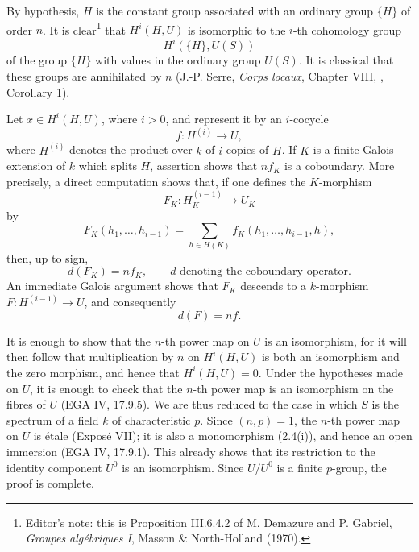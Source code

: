 By hypothesis, \(H\) is the constant group associated with an
ordinary group \(\{H\}\) of order \(n\).  It is
clear\footnote{Editor's note: this is Proposition III.6.4.2 of
M. Demazure and P. Gabriel, \emph{Groupes algébriques I},
Masson \& North-Holland (1970).} that \(H^i(H,U)\) is isomorphic
to the \(i\)-th cohomology group
\[
  H^i(\{H\},U(S))
\]
of the group \(\{H\}\) with values in the ordinary group \(U(S)\).
It is classical that these groups are annihilated by \(n\)
(J.-P. Serre, \emph{Corps locaux}, Chapter VIII, ,
Corollary 1).

Let \(x\in H^i(H,U)\), where \(i>0\), and represent it by an
\(i\)-cocycle
\[
  f:H^{(i)}\longrightarrow U,
\]
where \(H^{(i)}\) denotes the product over \(k\) of \(i\) copies
of \(H\).  If \(K\) is a finite Galois extension of \(k\) which
splits \(H\), assertion  shows that \(nf_K\) is a coboundary.
More precisely, a direct computation shows that, if one defines
the \(K\)-morphism
\[
  F_K:H_K^{(i-1)}\longrightarrow U_K
\]
by
\[
  F_K(h_1,\ldots,h_{i-1})
    =\sum_{h\in H(K)}
      f_K(h_1,\ldots,h_{i-1},h),
\]
then, up to sign,
\[
  d(F_K)=nf_K,
  \qquad d\text{ denoting the coboundary operator}.
\]
An immediate Galois argument shows that \(F_K\) descends to a
\(k\)-morphism \(F:H^{(i-1)}\to U\), and consequently
\[
  d(F)=nf.
\]




It is enough to show that the \(n\)-th power map on \(U\) is an
isomorphism, for it will then follow that multiplication by \(n\)
on \(H^i(H,U)\) is both an isomorphism and the zero morphism, and
hence that \(H^i(H,U)=0\).  Under the hypotheses made on \(U\), it
is enough to check that the \(n\)-th power map is an isomorphism
on the fibres of \(U\) (EGA IV, 17.9.5).  We are thus reduced to
the case in which \(S\) is the spectrum of a field \(k\) of
characteristic \(p\).  Since \((n,p)=1\), the \(n\)-th power map
on \(U\) is étale (Exposé VII); it is also a monomorphism (2.4(i)),
and hence an open immersion (EGA IV, 17.9.1).  This already shows
that its restriction to the identity component \(U^0\) is an
isomorphism.  Since \(U/U^0\) is a finite \(p\)-group, the proof
is complete.

